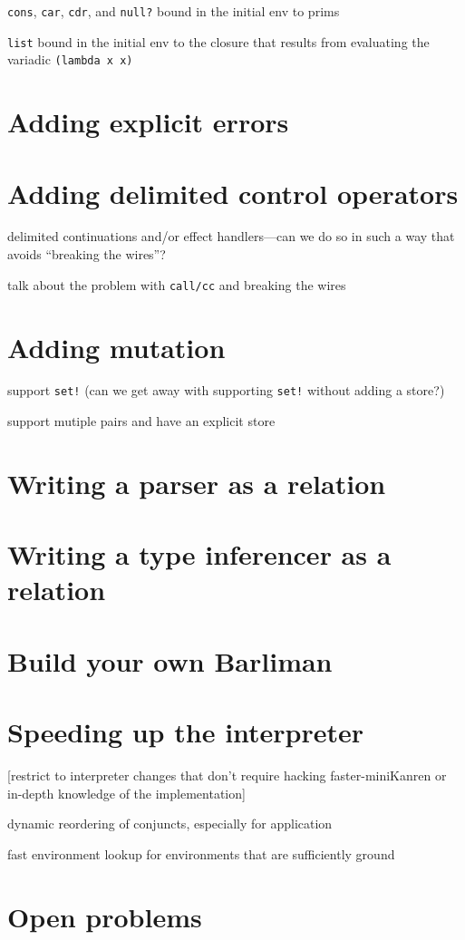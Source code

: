 \documentclass{book}
\begin{document}
\verb|cons|, \verb|car|, \verb|cdr|, and \verb|null?| bound in the initial env to prims

\verb|list| bound in the initial env to the closure that results from evaluating the variadic \verb|(lambda x x)|


\chapter{Adding explicit errors}%


\chapter{Adding delimited control operators}%

delimited continuations and/or effect handlers---can we do so in such a way that avoids ``breaking the wires''?

talk about the problem with \verb|call/cc| and breaking the wires


\chapter{Adding mutation}%

support \verb|set!| (can we get away with supporting \verb|set!| without adding a store?)

support mutiple pairs and have an explicit store


\chapter{Writing a parser as a relation}%


\chapter{Writing a type inferencer as a relation}%


\chapter{Build your own Barliman}%


\chapter{Speeding up the interpreter}%

[restrict to interpreter changes that don't require hacking faster-miniKanren or in-depth knowledge of the implementation]

dynamic reordering of conjuncts, especially for application

fast environment lookup for environments that are sufficiently ground


\chapter{Open problems}%


\appendix
\end{document}
